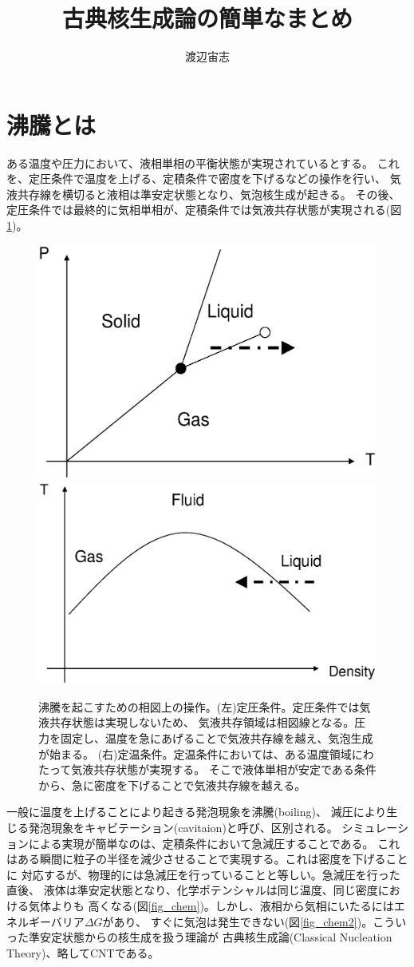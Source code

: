 \documentclass{jarticle}
\title{古典核生成論の簡単なまとめ}
\author{渡辺宙志}
\affiliation{慶応義塾大学理工学部物理情報工学科}
\begin{document}
\maketitle

\section{沸騰とは}

ある温度や圧力において、液相単相の平衡状態が実現されているとする。
これを、定圧条件で温度を上げる、定積条件で密度を下げるなどの操作を行い、
気液共存線を横切ると液相は準安定状態となり、気泡核生成が起きる。
その後、定圧条件では最終的に気相単相が、定積条件では気液共存状態が実現される(図\ref{fig_boil})。

\begin{figure}[htbp]
    \begin{center}
        \includegraphics[width=0.45\linewidth]{pconst.eps}
        \includegraphics[width=0.45\linewidth]{vconst.eps}
    \end{center}
    \caption{
        沸騰を起こすための相図上の操作。(左)定圧条件。定圧条件では気液共存状態は実現しないため、
        気液共存領域は相図線となる。圧力を固定し、温度を急にあげることで気液共存線を越え、気泡生成が始まる。
        (右)定温条件。定温条件においては、ある温度領域にわたって気液共存状態が実現する。
        そこで液体単相が安定である条件から、急に密度を下げることで気液共存線を越える。
    }
    \label{fig_boil}
\end{figure}

一般に温度を上げることにより起きる発泡現象を沸騰(boiling)、
減圧により生じる発泡現象をキャビテーション(cavitaion)と呼び、区別される。
シミュレーションによる実現が簡単なのは、定積条件において急減圧することである。
これはある瞬間に粒子の半径を減少させることで実現する。これは密度を下げることに
対応するが、物理的には急減圧を行っていることと等しい。急減圧を行った直後、
液体は準安定状態となり、化学ポテンシャルは同じ温度、同じ密度における気体よりも
高くなる(図\ref{fig_chem})。しかし、液相から気相にいたるにはエネルギーバリア$\Delta G$があり、
すぐに気泡は発生できない(図\ref{fig_chem2})。こういった準安定状態からの核生成を扱う理論が
古典核生成論(Classical Nucleation Theory)、略してCNTである。
\end{document}
